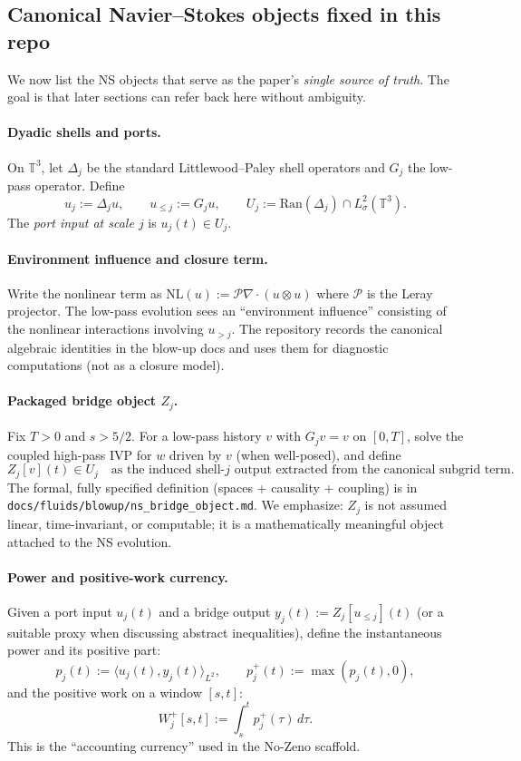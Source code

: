\documentclass[11pt]{article}
\begin{document}
\subsection{Canonical Navier--Stokes objects fixed in this repo}
\label{sec:ns_object_mapping}

We now list the NS objects that serve as the paper's \emph{single source of truth}. The goal is that later sections can refer back here without ambiguity.

\paragraph{Dyadic shells and ports.}
On $\mathbb{T}^3$, let $\Delta_j$ be the standard Littlewood--Paley shell operators and $G_j$ the low-pass operator. Define
\[
u_j:=\Delta_j u,\qquad u_{\le j}:=G_j u,\qquad U_j:=\mathrm{Ran}(\Delta_j)\cap L^2_\sigma(\mathbb{T}^3).
\]
The \emph{port input at scale $j$} is $u_j(t)\in U_j$.

\paragraph{Environment influence and closure term.}
Write the nonlinear term as $\mathrm{NL}(u):=\mathcal{P}\nabla\cdot(u\otimes u)$ where $\mathcal{P}$ is the Leray projector. The low-pass evolution sees an ``environment influence'' consisting of the nonlinear interactions involving $u_{>j}$. The repository records the canonical algebraic identities in the blow-up docs and uses them for diagnostic computations (not as a closure model).

\paragraph{Packaged bridge object $Z_j$.}
Fix $T>0$ and $s>5/2$. For a low-pass history $v$ with $G_j v=v$ on $[0,T]$, solve the coupled high-pass IVP for $w$ driven by $v$ (when well-posed), and define
\[
Z_j[v](t)\in U_j
\quad\text{as the induced shell-$j$ output extracted from the canonical subgrid term.}
\]
The formal, fully specified definition (spaces + causality + coupling) is in
\nolinkurl{docs/fluids/blowup/ns_bridge_object.md}.
We emphasize: $Z_j$ is not assumed linear, time-invariant, or computable; it is a mathematically meaningful object attached to the NS evolution.

\paragraph{Power and positive-work currency.}
Given a port input $u_j(t)$ and a bridge output $y_j(t):=Z_j[u_{\le j}](t)$ (or a suitable proxy when discussing abstract inequalities), define the instantaneous power and its positive part:
\[
p_j(t):=\langle u_j(t),y_j(t)\rangle_{L^2},\qquad p_j^+(t):=\max(p_j(t),0),
\]
and the positive work on a window $[s,t]$:
\[
W_j^+[s,t]:=\int_s^t p_j^+(\tau)\,d\tau.
\]
This is the ``accounting currency'' used in the No-Zeno scaffold.
\end{document}
